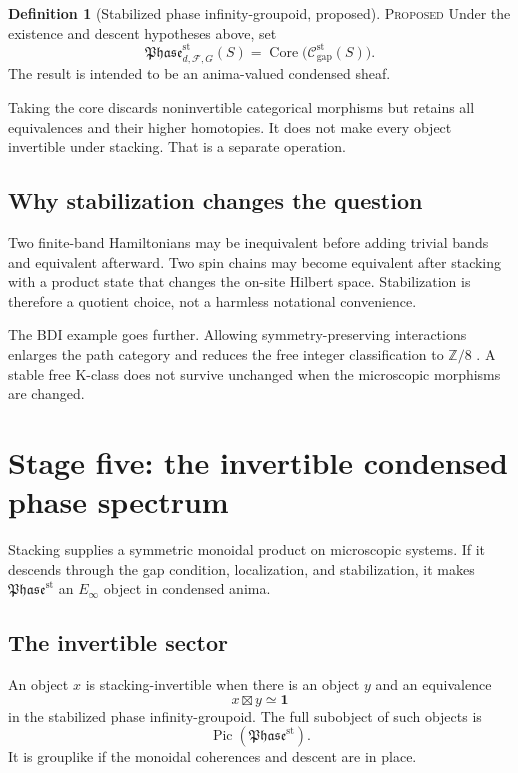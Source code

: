 \documentclass[12pt]{article}
\theoremstyle{definition}
\newtheorem{definition}[theorem]{Definition}
\theoremstyle{remark}
\newcommand{\C}{\mathcal C}
\newcommand{\F}{\mathcal F}
\newcommand{\Phase}{\mathfrak{Phase}}
\newcommand{\Pic}{\operatorname{Pic}}
\newcommand{\Core}{\operatorname{Core}}
\newcommand{\PROP}{\textnormal{\textsc{Proposed}}}
\begin{document}
\begin{definition}[Stabilized phase infinity-groupoid, proposed]
\PROP{}  Under the existence and descent hypotheses above, set
\begin{equation}
\Phase^{\mathrm{st}}_{d,\F,G}(S)
=
\Core\bigl(\C_{\mathrm{gap}}^{\mathrm{st}}(S)\bigr).
\label{eq:phase-groupoid}
\end{equation}
The result is intended to be an anima-valued condensed sheaf.
\end{definition}

Taking the core discards noninvertible categorical morphisms but retains all
equivalences and their higher homotopies.  It does not make every object
invertible under stacking.  That is a separate operation.

\subsection{Why stabilization changes the question}

Two finite-band Hamiltonians may be inequivalent before adding trivial
bands and equivalent afterward.  Two spin chains may become equivalent
after stacking with a product state that changes the on-site Hilbert space.
Stabilization is therefore a quotient choice, not a harmless notational
convenience.

The BDI example goes further.  Allowing symmetry-preserving interactions
enlarges the path category and reduces the free integer classification to
$\mathbb Z/8$ \cite{FidkowskiKitaev2010}.  A stable free K-class does not survive unchanged when the
microscopic morphisms are changed.

\section{Stage five: the invertible condensed phase spectrum}

Stacking supplies a symmetric monoidal product on microscopic systems.  If
it descends through the gap condition, localization, and stabilization, it
makes $\Phase^{\mathrm{st}}$ an $E_\infty$ object in condensed anima.

\subsection{The invertible sector}

An object $x$ is stacking-invertible when there is an object $y$ and an
equivalence
\begin{equation}
x\boxtimes y\simeq\mathbf 1
\end{equation}
in the stabilized phase infinity-groupoid.  The full subobject of such
objects is
\begin{equation}
\Pic(\Phase^{\mathrm{st}}).
\label{eq:picard-phase}
\end{equation}
It is grouplike if the monoidal coherences and descent are in place.
\end{document}
